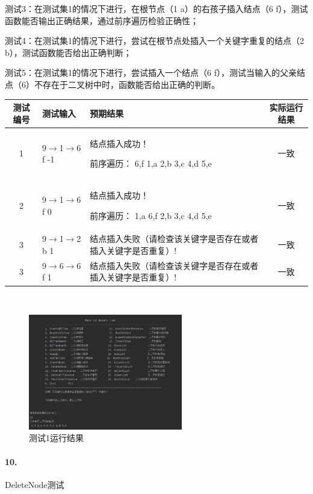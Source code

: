 \documentclass[supercite]{Experimental_Report}
\theoremstyle{definition}
\begin{document}
测试3：在测试集1的情况下进行，在根节点（1 a）的右孩子插入结点（6 f），测试函数能否输出正确结果，通过前序遍历检验正确性；

测试4：在测试集1的情况下进行，尝试在根节点处插入一个关键字重复的结点（2 b），测试函数能否给出正确判断；

测试5：在测试集1的情况下进行，尝试插入一个结点（6 f），测试当输入的父亲结点（6）不存在于二叉树中时，函数能否给出正确的判断。

\vspace{0.5em}

\begin{tabular}{|c|l|p{6cm}|c|}
	\hline
	测试编号 & 测试输入 & 预期结果 & 实际运行结果 \\
	\hline
	1 & 9$\rightarrow$1$\rightarrow$6 f -1 & 结点插入成功！

前序遍历： 6,f 1,a 2,b 3,c 4,d 5,e & 一致 \\
	\hline
	2 & 9$\rightarrow$1$\rightarrow$6 f 0 & 结点插入成功！

前序遍历：  1,a 6,f 2,b 3,c 4,d 5,e & 一致 \\
	\hline
	3 & 9$\rightarrow$1$\rightarrow$2 b 1 & 结点插入失败（请检查该关键字是否存在或者插入关键字是否重复）! & 一致 \\
	\hline
	3 & 9$\rightarrow$6$\rightarrow$6 f 1 & 结点插入失败（请检查该关键字是否存在或者插入关键字是否重复）! & 一致 \\
	\hline
\end{tabular}

~\

\begin{figure}[H]
 	\centering
 	\includegraphics[width=0.6\textwidth]{images/二叉树测试9.png}
 	\caption{测试1运行结果}
 	\label{txlab}
 \end{figure}

\paragraph{10.}DeleteNode测试
\end{document}
